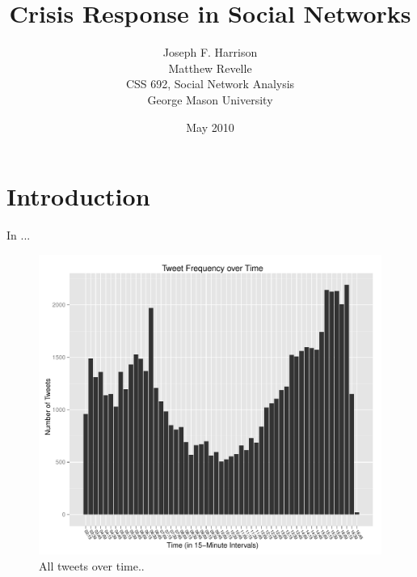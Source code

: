 \documentclass[a4paper, 11pt, titlepage]{article}
\begin{document}
\title{Crisis Response in Social Networks}
\author{Joseph F. Harrison \\
        Matthew Revelle \\
        CSS 692, Social Network Analysis \\
        George Mason University}
\date{May 2010}
\maketitle

\tableofcontents

\section{Introduction}

In \cite{Deards2009} ...

\begin{figure}[h]
\centering
\label{fig:all_tweets_over_time}
\includegraphics[width=120mm]{../figures/all_tweets_over_time}
\caption{All tweets over time..}
\end{figure}
\end{document}
